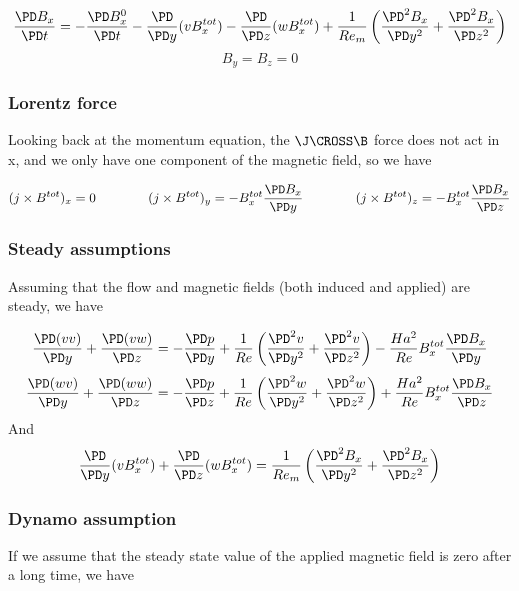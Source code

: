 \documentclass[11pt]{article}
\begin{document}
\begin{equation}
	\frac{\PD B_x}{\PD t}
	=
	- \frac{\PD B_x^0}{\PD t}
	- \frac{\PD}{\PD y} (v B_x^{tot})
	- \frac{\PD}{\PD z} (w B_x^{tot})
	+ \frac{1}{Re_m}
	\left(
	\frac{\PD^2 B_x}{\PD y^2}
	+
	\frac{\PD^2 B_x}{\PD z^2}
	\right)
\end{equation}
\begin{equation}
	B_y = B_z = 0
\end{equation}

\subsubsection{Lorentz force}

Looking back at the momentum equation, the $\J \CROSS \B$ force does not act in x, and we only have one component of the magnetic field, so we have

\begin{equation}
	(j \times B^{tot})_x = 0
	\qquad \qquad
	(j \times B^{tot})_y = -	B_x^{tot} \frac{\PD B_x}{\PD y}
	\qquad \qquad
	(j \times B^{tot})_z = - B_x^{tot} \frac{\PD B_x}{\PD z}
\end{equation}

\subsubsection{Steady assumptions}
Assuming that the flow and magnetic fields (both induced and applied) are steady, we have

\begin{equation}
	\frac{\PD (v v)}{\PD y}
	+ \frac{\PD (v w)}{\PD z}
	=
	- \frac{\PD p}{\PD y}
	+ \frac{1}{Re}
	\left(
	\frac{\PD^2 v}{\PD y^2}
	+\frac{\PD^2 v}{\PD z^2}
	\right)
	-
	\frac{Ha^2}{Re}
	B_x^{tot}
	\frac{\PD B_x}{\PD y}
\end{equation}
\begin{equation}
	\frac{\PD (w v)}{\PD y}
	+ \frac{\PD (w w)}{\PD z}
	=
	- \frac{\PD p}{\PD z}
	+ \frac{1}{Re}
	\left(
	\frac{\PD^2 w}{\PD y^2}
	+\frac{\PD^2 w}{\PD z^2}
	\right)
	+ \frac{Ha^2}{Re}
	B_x^{tot}
	\frac{\PD B_x}{\PD z}
\end{equation}
And
\begin{equation}
	\frac{\PD}{\PD y} (v B_x^{tot})
	+ \frac{\PD}{\PD z} (w B_x^{tot})
	=
	\frac{1}{Re_m}
	\left(
	\frac{\PD^2 B_x}{\PD y^2}
	+
	\frac{\PD^2 B_x}{\PD z^2}
	\right)
\end{equation}

\subsubsection{Dynamo assumption}
If we assume that the steady state value of the applied magnetic field is zero after a long time, we have
\end{document}
